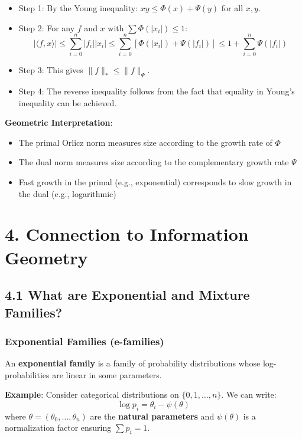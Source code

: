 \documentclass{amsart}
\theoremstyle{plain}
\theoremstyle{definition}
\theoremstyle{remark}
\begin{document}
\begin{itemize}
	\item Step 1: By the Young inequality: $xy \leq \Phi(x) + \Psi(y)$ for all $x, y$.
	\item Step 2: For any $f$ and $x$ with $\sum \Phi(|x_i|) \leq 1$:
\[
|\langle f, x \rangle| \leq \sum_{i=0}^n |f_i||x_i| \leq \sum_{i=0}^n [\Phi(|x_i|) + \Psi(|f_i|)] \leq 1 + \sum_{i=0}^n \Psi(|f_i|)
\]
	\item Step 3: This gives $\|f\|_* \leq \|f\|_\Psi$.
	\item Step 4: The reverse inequality follows from the fact that equality in Young's inequality can be achieved.
\end{itemize}

\textbf{Geometric Interpretation}:

\begin{itemize}
	\item The primal Orlicz norm measures size according to the growth rate of $\Phi$
	\item The dual norm measures size according to the complementary growth rate $\Psi$
	\item Fast growth in the primal (e.g., exponential) corresponds to slow growth in the dual (e.g., logarithmic)
\end{itemize}

\section{4. Connection to Information Geometry}

\subsection{4.1 What are Exponential and Mixture Families?}

\subsubsection{Exponential Families (e-families)}

An \textbf{exponential family} is a family of probability distributions whose log-probabilities are linear in some parameters.

\textbf{Example}: Consider categorical distributions on $\{0, 1, \ldots, n\}$. We can write:
\[
\log p_i = \theta_i - \psi(\theta)
\]
where $\theta = (\theta_0, \ldots, \theta_n)$ are the \textbf{natural parameters} and $\psi(\theta)$ is a normalization factor ensuring $\sum p_i = 1$.
\end{document}
